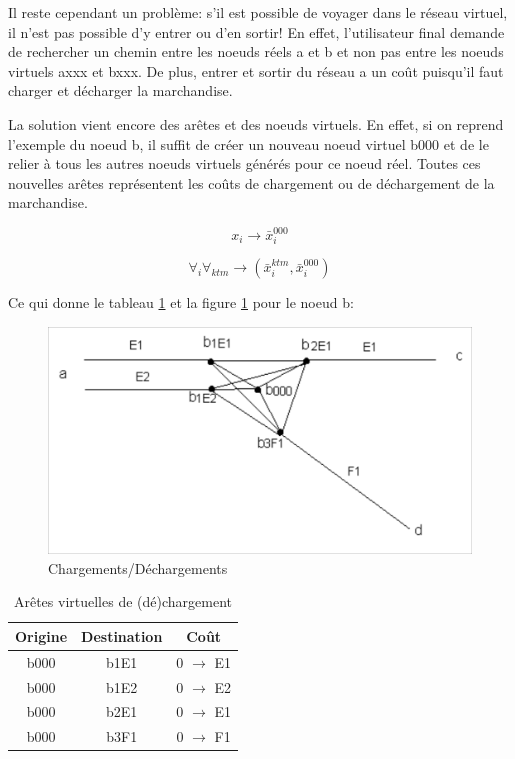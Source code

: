 Il reste cependant un problème: s'il est possible de voyager dans
le réseau virtuel, il n'est pas possible d'y entrer ou d'en sortir!
En effet, l'utilisateur final demande de rechercher un chemin entre
les noeuds réels a et b et non pas entre les noeuds virtuels axxx
et bxxx.  De plus, entrer et sortir du réseau a un coût puisqu'il
faut charger et décharger la marchandise.

La solution vient encore des arêtes et des noeuds virtuels. En
effet, si on reprend l'exemple du noeud b, il suffit de créer un
nouveau noeud virtuel b000 et de le relier à tous les autres noeuds
virtuels générés pour ce noeud réel. Toutes ces nouvelles arêtes
représentent les coûts de chargement ou de déchargement de la
marchandise.

$$x_i \rightarrow \bar x_i^{000}$$

$$\forall_i \forall_{ktm} \rightarrow (\bar x_i^{ktm}, \bar x_i^{000})$$


Ce qui donne le tableau \ref{tab3_5} et la figure \ref{f3_7} pour le noeud b:

\begin{figure}[htbp]
\centerline{\includegraphics[width=12cm]{f3_7.png}}
\caption{\label{f3_7} Chargements/D\'echargements}
\end{figure}

\begin{table}[htbp]
\begin{center}
\begin{tabular}{ccc}
\hline
Origine & Destination & Coût\\
\hline
b000 & b1E1 & 0 $\rightarrow$ E1\\

b000 & b1E2 & 0 $\rightarrow$ E2\\

b000 & b2E1 & 0 $\rightarrow$ E1\\

b000 & b3F1 & 0 $\rightarrow$ F1\\
\hline
\end{tabular}
\caption{\label{tab3_5} Ar\^etes virtuelles de (d\'e)chargement}
\end{center}
\end{table}

